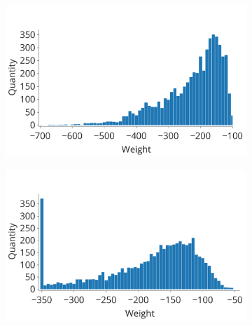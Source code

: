 \documentclass[a4paper,10pt]{article}
\begin{document}
\begin{figure}[H] 
\centering 
\begin{subfigure}{0.45\textwidth}
    \includegraphics[width=\textwidth,keepaspectratio=true]{competition_distribution_clamp_low.pdf}
    \caption{}
    \label{fig:compe_clamp:low_distr}
\end{subfigure}
\begin{subfigure}{0.45\textwidth}
    \includegraphics[width=\textwidth,keepaspectratio=true]{competition_distribution_clamp_high.pdf}
    \caption{}
    \label{fig:compe_clamp:high_distr}
\end{subfigure}
\begin{subfigure}{0.45\textwidth}

\end{subfigure}
\end{figure}
\end{document}
